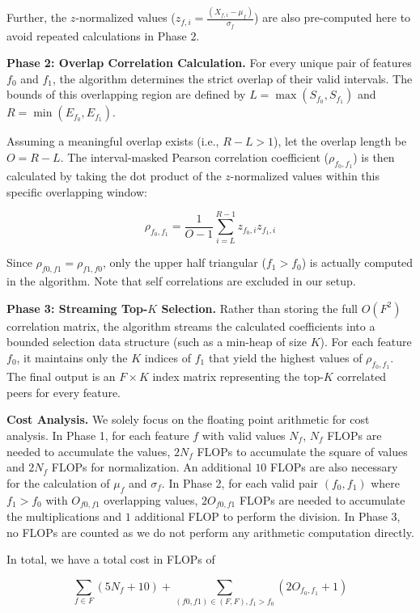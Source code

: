 \documentclass[letterpaper]{article}
\newcommand{\mypar}[1]{{\bf #1.}}
\begin{document}
Further, the $z$-normalized values ($z_{f, i} = \frac{(X_{f, i} - \mu_{f})}{\sigma_{f}}$) are also pre-computed here to avoid repeated calculations in Phase 2.

\textbf{Phase 2: Overlap Correlation Calculation.}
For every unique pair of features $f_0$ and $f_1$, the algorithm determines the strict overlap of their valid intervals.
The bounds of this overlapping region are defined by $L = \max(S_{f_0}, S_{f_1})$ and $R = \min(E_{f_0}, E_{f_1})$. 

Assuming a meaningful overlap exists (i.e., $R - L > 1$), let the overlap length be $O = R - L$.
The interval-masked Pearson correlation coefficient ($\rho_{f_0, f_1}$) is then calculated by taking the dot product of the $z$-normalized values within this specific overlapping window:

$$ \rho_{f_0, f_1} = \frac{1}{O - 1} \sum_{i=L}^{R-1} z_{f_0, i} z_{f_1, i} $$

Since $\rho_{f0, f1} = \rho_{f1, f0}$, only the upper half triangular ($f_1 > f_0$) is actually computed in the algorithm. Note that self correlations are excluded in our setup.

\textbf{Phase 3: Streaming Top-$K$ Selection.}
Rather than storing the full $O(F^2)$ correlation matrix, the algorithm streams the calculated coefficients into a bounded selection data structure (such as a min-heap of size $K$).
For each feature $f_0$, it maintains only the $K$ indices of $f_1$ that yield the highest values of $\rho_{f_0, f_1}$.
The final output is an $F \times K$ index matrix representing the top-$K$ correlated peers for every feature.

\mypar{Cost Analysis}
We solely focus on the floating point arithmetic for cost analysis.
In Phase 1, for each feature $f$ with valid values $N_f$, $N_f$ FLOPs are needed to accumulate the values, $2N_f$ FLOPs to accumulate the square of values and $2N_f$ FLOPs for normalization. An additional $10$ FLOPs are also necessary for the calculation of $\mu_f$ and $\sigma_f$.
In Phase 2, for each valid pair $(f_0, f_1)$ where $f_1 > f_0$ with $O_{f0, f1}$ overlapping values, $2O_{f0, f1}$ FLOPs are needed to accumulate the multiplications and $1$ additional FLOP to perform the division.
In Phase 3, no FLOPs are counted as we do not perform any arithmetic computation directly.

In total, we have a total cost in FLOPs of

$$ \sum_{f \in F} (5N_f + 10) + \sum_{(f0, f1) \in (F, F), f_1 > f_0} (2O_{f_0, f_1} + 1) $$
\end{document}
